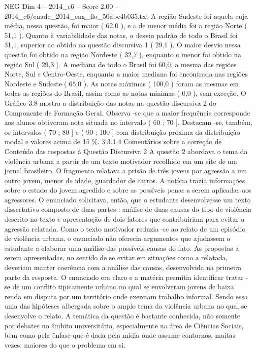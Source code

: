 \begin{textsample}{NEG Dim 4 – 2014\_c6 – Score 2.00 – 2014\_c6/enade\_2014\_eng\_flo\_50abc4b035.txt}
A região Sudeste foi aquela cuja média, nessa questão, foi maior ( 62,0 ), e a de menor média foi a região Norte ( 51,1 ).
Quanto à variabilidade das notas, o desvio padrão de todo o Brasil foi 31,1, superior ao obtido na questão discursiva 1 ( 29,1 ).
O maior desvio nessa questão foi obtido na região Nordeste ( 32,7 ), enquanto o menor foi obtido na região Sul ( 29,3 ).
A mediana de todo o Brasil foi 60,0, a mesma das regiões Norte, Sul e Centro-Oeste, enquanto a maior mediana foi encontrada nas regiões Nordeste e Sudeste ( 65,0 ).
As notas máximas ( 100,0 ) foram as mesmas em todas as regiões do Brasil, assim como as notas mínimas ( 0,0 ), sem exceção.
O Gráfico 3.8 mostra a distribuição das notas na questão discursiva 2 do Componente de Formação Geral.
Observa -se que a maior frequência corresponde aos alunos obtiveram nota situada no intervalo ( 60 ; 70 ].
Destacam -se, também, os intervalos ( 70 ; 80 ] e ( 90 ; 100 ] com distribuição próxima da distribuição modal e valores acima de 15 \%. 3.3.1.4 Comentários sobre a correção de Conteúdo das respostas à Questão Discursiva 2 A questão 2 abordava o tema da violência urbana a partir de um texto motivador recolhido em um site de um jornal brasileiro.
O fragmento relatava a prisão de três jovens por agressão a um outro jovem, menor de idade, guardador de carros.
A notícia trazia informações sobre o estado do jovem agredido e sobre as possíveis penas a serem aplicadas aos agressores.
O enunciado solicitava, então, que o estudante desenvolvesse um texto dissertativo composto de duas partes : análise de duas causas do tipo de violência descrito no texto e apresentação de dois fatores que contribuiriam para evitar a agressão relatada.
Como o texto motivador reduzia -se ao relato de um episódio de violência urbana, o enunciado não oferecia argumentos que ajudassem o estudante a elaborar uma análise das possíveis causas do fato.
As propostas a serem apresentadas, no sentido de se evitar em situações como a relatada, deveriam manter coerência com a análise das causas, desenvolvida na primeira parte da resposta.
O enunciado era claro e a matéria permitia identificar tratar -se de um conflito tipicamente urbano no qual se envolveram jovens de baixa renda em disputa por um território onde exerciam trabalho informal.
Sendo essa uma das hipóteses albergada sobre o amplo tema da violência urbana no qual se desenvolve o relato.
A temática da questão é bastante conhecida, não somente por debates no âmbito universitário, especialmente na área de Ciências Sociais, bem como pela ênfase que é dada pela mídia onde assume contornos, muitas vezes, maiores do que o problema em si.

\end{textsample}
